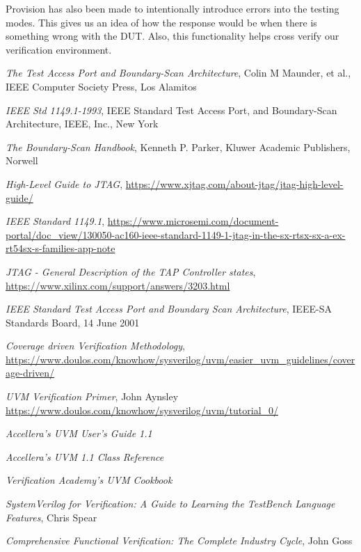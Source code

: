 \documentclass[a4paper,11pt]{article}
\begin{document}
Provision has also been made to intentionally introduce errors into the testing modes. This gives us an idea of how the response would be when there is something wrong with the DUT. Also, this functionality helps cross verify our verification environment.
%
\newpage

\begin{thebibliography}{i}
 {\em The Test Access Port and Boundary-Scan Architecture}, Colin M Maunder, et al., IEEE Computer Society Press, Los Alamitos

 {\em IEEE Std 1149.1-1993}, IEEE Standard Test Access Port, and Boundary-Scan Architecture, IEEE, Inc., New York

 {\em The Boundary-Scan Handbook}, Kenneth P. Parker, Kluwer Academic Publishers, Norwell

 {\em High-Level Guide to JTAG},
\url{https://www.xjtag.com/about-jtag/jtag-high-level-guide/}

 {\em IEEE Standard 1149.1},
\url{https://www.microsemi.com/document-portal/doc_view/130050-ac160-ieee-standard-1149-1-jtag-in-the-sx-rtsx-sx-a-ex-rt54sx-s-families-app-note}

 {\em JTAG - General Description of the TAP Controller states},
\url{https://www.xilinx.com/support/answers/3203.html}

 {\em IEEE Standard Test Access Port and Boundary Scan Architecture}, IEEE-SA Standards Board, 14 June 2001

 {\em Coverage driven Verification Methodology},
\url{https://www.doulos.com/knowhow/sysverilog/uvm/easier_uvm_guidelines/coverage-driven/}

 {\em UVM Verification Primer}, John Aynsley
\url{https://www.doulos.com/knowhow/sysverilog/uvm/tutorial_0/}

 {\em Accellera's UVM User's Guide 1.1}

 {\em Accellera's UVM 1.1 Class Reference}

 {\em Verification Academy's UVM Cookbook}

 {\em SystemVerilog for Verification: A Guide to Learning the TestBench Language Features}, Chris Spear

 {\em Comprehensive Functional Verification: The Complete Industry Cycle}, John Goss


\end{thebibliography}
\end{document}

